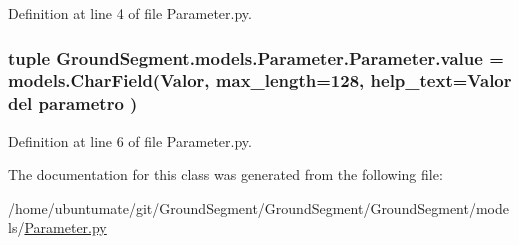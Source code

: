 Definition at line 4 of file Parameter.\+py.

\hypertarget{class_ground_segment_1_1models_1_1_parameter_1_1_parameter_a7186899b0882d6b4134ca24ed6f2bbc8}{}
\subsubsection[{value}]{\setlength{\rightskip}{0pt plus 5cm}tuple Ground\+Segment.\+models.\+Parameter.\+Parameter.\+value = models.\+Char\+Field(\textquotesingle{}Valor\textquotesingle{}, max\+\_\+length=128, help\+\_\+text=\textquotesingle{}Valor del parametro\textquotesingle{} )\hspace{0.3cm}{\ttfamily [static]}}\label{class_ground_segment_1_1models_1_1_parameter_1_1_parameter_a7186899b0882d6b4134ca24ed6f2bbc8}


Definition at line 6 of file Parameter.\+py.



The documentation for this class was generated from the following file\+:\begin{DoxyCompactItemize}
\item 
/home/ubuntumate/git/\+Ground\+Segment/\+Ground\+Segment/\+Ground\+Segment/models/\hyperlink{_parameter_8py}{Parameter.\+py}\end{DoxyCompactItemize}

